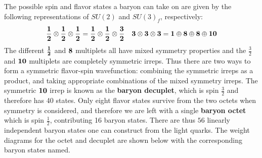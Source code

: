 \documentclass[11pt, oneside]{article}   	%
\theoremstyle{definition}
\numberwithin{equation}{subsection}		%
\begin{document}
The possible spin and flavor states a baryon can take on are given by the following representations of $SU(2)$ and $SU(3)_f$, respectively:
\begin{align}
	\bf \frac{1}{2}\otimes \frac{1}{2}\otimes \frac{1}{2} = \frac{1}{2}\otimes\frac{1}{2}\otimes\frac{3}{2} && 
	\bf 3\otimes 3\otimes 3 = 1 \oplus 8\oplus 8\oplus 10
\end{align}
The different $\bf \frac{1}{2}$ and $\bf{8}$ multiplets all have mixed symmetry properties and the $\frac{3}{2}$ and $\bf 10$ multiplets are completely symmetric irreps. 
Thus there are two ways to form a symmetric flavor-spin wavefunction: combining the symmetric irreps as a product, and taking appropriate combinations 
of the mixed symmetry irreps. The symmetric $\bf 10$ irrep is known as the \textbf{baryon decuplet}, which is spin $\frac{3}{2}$ and therefore has 40 states. 
Only eight flavor states survive from the two octets when symmetry is considered, and therefore we are left with a single \textbf{baryon octet} which is 
spin $\frac{1}{2}$, contributing 16 baryon states. There are thus $56$ linearly independent baryon states one can construct from the light quarks. The weight 
diagrams for the octet and decuplet are shown below with the corresponding baryon states named.
\end{document}
